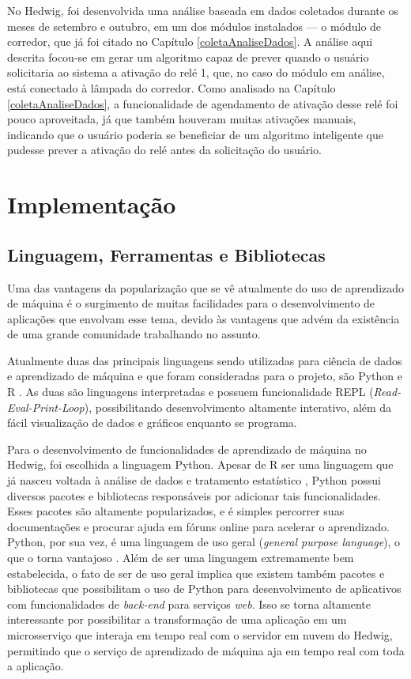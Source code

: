 		No Hedwig, foi desenvolvida uma análise baseada em dados coletados durante os meses de setembro e outubro, em um dos módulos instalados --- o módulo de corredor, que já foi citado no Capítulo \ref{coletaAnaliseDados}. A análise aqui descrita focou-se em gerar um algoritmo capaz de prever quando o usuário solicitaria ao sistema a ativação do relé 1, que, no caso do módulo em análise, está conectado à lâmpada do corredor. Como analisado na Capítulo \ref{coletaAnaliseDados}, a funcionalidade de agendamento de ativação desse relé foi pouco aproveitada, já que também houveram muitas ativações manuais, indicando que o usuário poderia se beneficiar de um algoritmo inteligente que pudesse prever a ativação do relé antes da solicitação do usuário.

	\section{Implementação}

		\subsection{Linguagem, Ferramentas e Bibliotecas}

			Uma das vantagens da popularização que se vê atualmente do uso de aprendizado de máquina é o surgimento de muitas facilidades para o desenvolvimento de aplicações que envolvam esse tema, devido às vantagens que advém da existência de uma grande comunidade trabalhando no assunto.

			Atualmente duas das principais linguagens sendo utilizadas para ciência de dados e aprendizado de máquina e que foram consideradas para o projeto, são Python e R \cite{languagesForML}. As duas são linguagens interpretadas e possuem funcionalidade REPL (\emph{Read-Eval-Print-Loop}), possibilitando desenvolvimento altamente interativo, além da fácil visualização de dados e gráficos enquanto se programa.

			Para o desenvolvimento de funcionalidades de aprendizado de máquina no Hedwig, foi escolhida a linguagem Python. Apesar de R ser uma linguagem que já nasceu voltada à análise de dados e tratamento estatístico \cite{rLanguage}, Python possui diversos pacotes e bibliotecas responsáveis por adicionar tais funcionalidades. Esses pacotes são altamente popularizados, e é simples percorrer suas documentações e procurar ajuda em fóruns online para acelerar o aprendizado. Python, por sua vez, é uma linguagem de uso geral (\emph{general purpose language}), o que o torna vantajoso \cite{pythonApplications}. Além de ser uma linguagem extremamente bem estabelecida, o fato de ser de uso geral implica que existem também pacotes e bibliotecas que possibilitam o uso de Python para desenvolvimento de aplicativos com funcionalidades de \emph{back-end} para serviços \emph{web}. Isso se torna altamente interessante por possibilitar a transformação de uma aplicação em um microsserviço que interaja em tempo real com o servidor em nuvem do Hedwig, permitindo que o serviço de aprendizado de máquina aja em tempo real com toda a aplicação.

